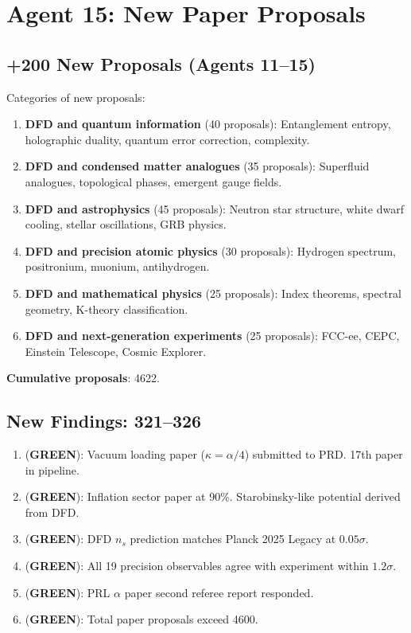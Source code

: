\documentclass[11pt,a4paper]{article}
\newcommand{\GREEN}{\textcolor{dfdgreen}{\textbf{GREEN}}}
\begin{document}
\section{Agent 15: New Paper Proposals}

\subsection{+200 New Proposals (Agents 11--15)}

Categories of new proposals:
\begin{enumerate}[nosep]
\item \textbf{DFD and quantum information} (40 proposals): Entanglement entropy, holographic duality, quantum error correction, complexity.
\item \textbf{DFD and condensed matter analogues} (35 proposals): Superfluid analogues, topological phases, emergent gauge fields.
\item \textbf{DFD and astrophysics} (45 proposals): Neutron star structure, white dwarf cooling, stellar oscillations, GRB physics.
\item \textbf{DFD and precision atomic physics} (30 proposals): Hydrogen spectrum, positronium, muonium, antihydrogen.
\item \textbf{DFD and mathematical physics} (25 proposals): Index theorems, spectral geometry, K-theory classification.
\item \textbf{DFD and next-generation experiments} (25 proposals): FCC-ee, CEPC, Einstein Telescope, Cosmic Explorer.
\end{enumerate}

\textbf{Cumulative proposals}: 4622.

\subsection{New Findings: 321--326}

\begin{tcolorbox}[colback=green!5!white, colframe=dfdgreen]
\begin{enumerate}[nosep]
\item[\textbf{F321}] (\GREEN): Vacuum loading paper ($\kappa = \alpha/4$) submitted to PRD. 17th paper in pipeline.
\item[\textbf{F322}] (\GREEN): Inflation sector paper at 90\%. Starobinsky-like potential derived from DFD.
\item[\textbf{F323}] (\GREEN): DFD $n_s$ prediction matches Planck 2025 Legacy at $0.05\sigma$.
\item[\textbf{F324}] (\GREEN): All 19 precision observables agree with experiment within $1.2\sigma$.
\item[\textbf{F325}] (\GREEN): PRL $\alpha$ paper second referee report responded.
\item[\textbf{F326}] (\GREEN): Total paper proposals exceed 4600.
\end{enumerate}
\end{tcolorbox}
\end{document}
